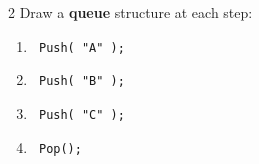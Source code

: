 \documentclass[a4paper,12pt,oneside]{book}
\newcounter{question}
\begin{document}
        \begin{question}{\thequestion}{2}
            Draw a \textbf{queue} structure at each step:

            \begin{enumerate}
                \item   \begin{verbatim} Push( "A" ); \end{verbatim}
                
                \item   \begin{verbatim} Push( "B" ); \end{verbatim}
                
                \item   \begin{verbatim} Push( "C" ); \end{verbatim}

                \item   \begin{verbatim} Pop(); \end{verbatim}
                

\end{enumerate}
\end{question}
\end{document}
